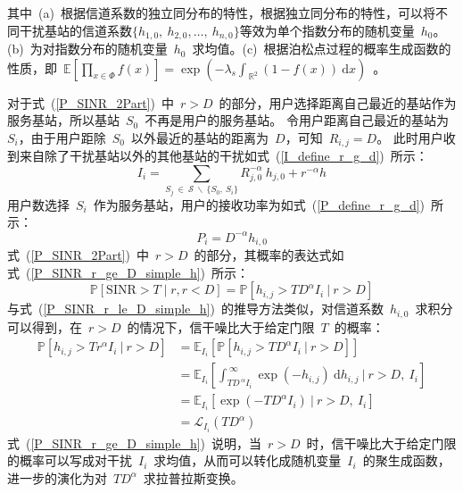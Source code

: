 其中~(a)~根据信道系数的独立同分布的特性，根据独立同分布的特性，可以将不同干扰基站的信道系数$\{h_{1,0},~h_{2,0},\dots,~h_{n,0}\}$等效为单个指数分布的随机变量~$h_0$。
(b)~为对指数分布的随机变量~$h_0$~求均值。(c)~根据泊松点过程的概率生成函数的性质，即~$\mathbb{E}\left[\prod\nolimits_{x\in\Phi}f(x)\right]=\exp(-\lambda_s\int_{~\mathbb{R}^2}(1-f(x))~\mathrm{d}x)$~。

对于式~(\ref{P_SINR_2Part})~中~$r > D$~的部分，用户选择距离自己最近的基站作为服务基站，所以基站~$S_0$~不再是用户的服务基站。
令用户距离自己最近的基站为~$S_i$，由于用户距除~$S_0$~以外最近的基站的距离为~$D$，可知~$R_{i,j}=D$。
此时用户收到来自除了干扰基站以外的其他基站的干扰如式~(\ref{I_define_r_g_d})~所示：
\begin{equation}\label{I_define_r_g_d}
I_i=\sum\limits_{ S_j\ \in\ {\mathcal{S}\ \backslash\ \{S_0,~S_i\}} }{R_{j,0}^{-\alpha} ~ h_{j,0}} + r^{-\alpha} h
\end{equation}
用户数选择~$S_i$~作为服务基站，用户的接收功率为如式~(\ref{P_define_r_g_d})~所示：
\begin{equation}\label{P_define_r_g_d}
  P_i = D^{-\alpha} h_{i,0}
\end{equation}
式~(\ref{P_SINR_2Part})~中~$r>D$~的部分，其概率的表达式如式~(\ref{P_SINR_r_ge_D_simple_h})~所示：
\begin{equation}\label{P_SINR_r_ge_D_simple_h}
  \mathbb{P}[\mathrm{SINR}>T \mid r, r < D] = \mathbb{P}\left[h_{i,j} > T D ^ \alpha I_i ~\big|~ r > D \right]
\end{equation}
与式~(\ref{P_SINR_r_le_D_simple_h})~的推导方法类似，对信道系数~$h_{i,0}$~求积分可以得到，在~$r>D$~的情况下，信干噪比大于给定门限~$T$~的概率：
\begin{equation}\label{P_SINR_r_ge_D_simple_h}
  \begin{aligned}
    \mathbb{P}\left[h_{i,j} > T r ^ \alpha I_i ~\bigg|~ r > D \right] & = \mathbb{E}_{I_i}\left[\mathbb{P}\left[h_{i,j} > T D ^ \alpha I_i ~\big|~ r > D\right]\right] \\
                                                                           & = \mathbb{E}_{I_i}\left[\int_{T D ^{\ \alpha} I_i}^{~\infty} \exp(-h_{i,j})~\mathrm{d} h_{i,j}~\bigg|~ r > D,~ I_i\right] \\
                                                                           & = \mathbb{E}_{I_i}\left[ \exp(-TD^\alpha I_i)~\big|~ r > D,~ I_i\right] \\
                                                                           & = \mathcal{L}_{I_i}(TD^\alpha)
  \end{aligned}
\end{equation}
式~(\ref{P_SINR_r_ge_D_simple_h})~说明，当~$r > D$~时，信干噪比大于给定门限的概率可以写成对干扰~$I_i$~求均值，从而可以转化成随机变量~$I_i$~的聚生成函数，
进一步的演化为对~$TD^\alpha$~求拉普拉斯变换。

